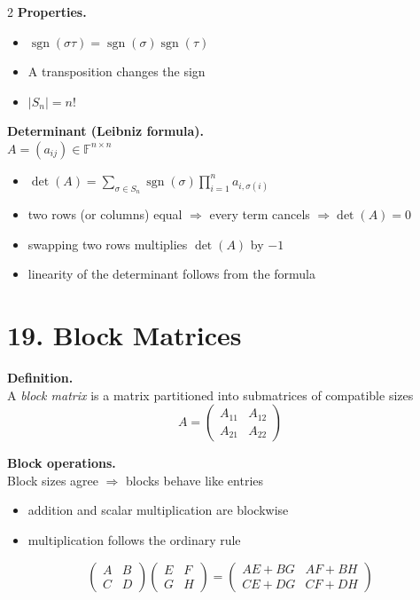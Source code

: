 \documentclass[fleqn]{article}
\newcommand{\subhead}[1]{\medskip\noindent\textbf{#1}}
\begin{document}
\begin{multicols}{2}
\subhead{Properties.}
\begin{itemize}
\item $\operatorname{sgn}(\sigma\tau)=\operatorname{sgn}(\sigma)\operatorname{sgn}(\tau)$
\item A transposition changes the sign
\item $|S_n| = n!$
\end{itemize}

\subhead{Determinant (Leibniz formula).}\\
$A=(a_{ij}) \in \mathbb{F}^{n\times n}$
\begin{itemize}
\item $\displaystyle \det(A)= \sum_{\sigma\in S_n} \operatorname{sgn}(\sigma) \prod_{i=1}^n a_{i,\sigma(i)}$
\item two rows (or columns) equal $\Rightarrow$ every term cancels $\Rightarrow \det(A)=0$
\item swapping two rows multiplies $\det(A)$ by $-1$
\item linearity of the determinant follows from the formula
\end{itemize}

\section*{19. Block Matrices}

\subhead{Definition.}\\
A \emph{block matrix} is a matrix partitioned into submatrices of compatible sizes
\[
A =
\begin{pmatrix}
A_{11} & A_{12} \\
A_{21} & A_{22}
\end{pmatrix}
\]

\subhead{Block operations.}\\
Block sizes agree $\Rightarrow$ blocks behave like entries
\begin{itemize}
\item addition and scalar multiplication are blockwise
\item multiplication follows the ordinary rule
\end{itemize}
\medskip
\[
\begin{pmatrix}
A & B\\
C & D
\end{pmatrix}
\begin{pmatrix}
E & F\\
G & H
\end{pmatrix}
=
\begin{pmatrix}
AE+BG & AF+BH\\
CE+DG & CF+DH
\end{pmatrix}
\]


\end{multicols}
\end{document}
